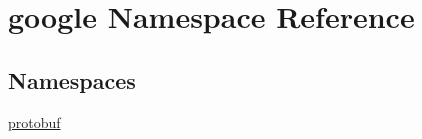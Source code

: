 \hypertarget{namespacegoogle}{}\section{google Namespace Reference}
\label{namespacegoogle}
\subsection*{Namespaces}
\begin{DoxyCompactItemize}
\item 
 \hyperlink{namespacegoogle_1_1protobuf}{protobuf}
\end{DoxyCompactItemize}
